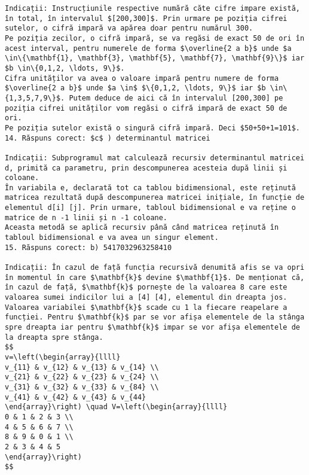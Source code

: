 \begin{verbatim}
Indicații: Instrucțiunile respective numără căte cifre impare există, în total, în intervalul $[200,300]$. Prin urmare pe poziția cifrei sutelor, o cifră impară va apărea doar pentru numărul 300.
Pe poziția zecilor, o cifră impară, se va regăsi de exact 50 de ori în acest interval, pentru numerele de forma $\overline{2 a b}$ unde $a \in\{\mathbf{1}, \mathbf{3}, \mathbf{5}, \mathbf{7}, \mathbf{9}\}$ iar $b \in\{0,1,2, \ldots, 9\}$.
Cifra unităților va avea o valoare impară pentru numere de forma $\overline{2 a b}$ unde $a \in$ $\{0,1,2, \ldots, 9\}$ iar $b \in\{1,3,5,7,9\}$. Putem deduce de aici că în intervalul [200,300] pe poziția cifrei unităților vom regăsi o cifră impară de exact 50 de ori.
Pe poziția sutelor există o singură cifră impară. Deci $50+50+1=101$.
14. Răspuns corect: $c$ ) determinantul matricei

Indicații: Subprogramul mat calculează recursiv determinantul matricei d, primită ca parametru, prin descompunerea acesteia după linii și coloane.
În variabila e, declarată tot ca tablou bidimensional, este reținută matricea rezultată după descompunerea matricei inițiale, în funcție de elementul d[i] [j]. Prin urmare, tabloul bidimensional e va reține o matrice de n -1 linii și n -1 coloane.
Aceasta metodă se aplică recursiv până când matricea reținută în tabloul bidimensional e va avea un singur element.
15. Răspuns corect: b) 5417032963258410

Indicații: În cazul de față funcția recursivă denumită afis se va opri în momentul în care $\mathbf{k}$ devine $\mathbf{1}$. De menționat că, în cazul de față, $\mathbf{k}$ pornește de la valoarea 8 care este valoarea sumei indicilor lui a [4] [4], elementul din dreapta jos.
Valoarea variabilei $\mathbf{k}$ scade cu 1 la fiecare reapelare a funcției. Pentru $\mathbf{k}$ par se vor afișa elementele de la stânga spre dreapta iar pentru $\mathbf{k}$ impar se vor afișa elementele de la dreapta spre stânga.
$$
v=\left(\begin{array}{llll}
v_{11} & v_{12} & v_{13} & v_{14} \\
v_{21} & v_{22} & v_{23} & v_{24} \\
v_{31} & v_{32} & v_{33} & v_{84} \\
v_{41} & v_{42} & v_{43} & v_{44}
\end{array}\right) \quad V=\left(\begin{array}{llll}
0 & 1 & 2 & 3 \\
4 & 5 & 6 & 7 \\
8 & 9 & 0 & 1 \\
2 & 3 & 4 & 5
\end{array}\right)
$$


\end{verbatim}
